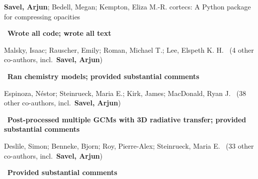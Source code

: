 




\item[{\color{numcolor}\scriptsize5}] \textbf{Savel, Arjun}; Bedell, Megan; Kempton, Eliza M.-R. cortecs: A Python package for compressing opacities

\ \textbf{Wrote all code; wrote all text}


\item[{\color{numcolor}\scriptsize4}] Malsky, Isaac; Rauscher, Emily; Roman, Michael T.; Lee, Elspeth K. H. \etal\ ({4} other co-authors, incl.\ \textbf{Savel, Arjun})

\ \textbf{Ran chemistry models; provided substantial comments}

\item[{\color{numcolor}\scriptsize3}] Espinoza, Néstor; Steinrueck, Maria E.; Kirk, James; MacDonald, Ryan J. \etal\ ({38} other co-authors, incl.\ \textbf{Savel, Arjun})

\ \textbf{Post-processed multiple GCMs with 3D radiative transfer; provided substantial comments}

\item[{\color{numcolor}\scriptsize2}] Deslile, Simon; Benneke, Bjorn; Roy, Pierre-Alex; Steinrueck, Maria E. \etal\ ({33} other co-authors, incl.\ \textbf{Savel, Arjun})

\ \textbf{Provided substantial comments}
